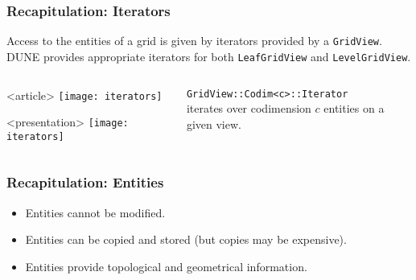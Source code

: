 \begin{frame}
  \frametitle{Recapitulation: Iterators}
  Access to the entities of a grid is given by iterators provided by a \lstinline!GridView!. DUNE provides
  appropriate iterators for both \lstinline!LeafGridView! and \lstinline!LevelGridView!.
  \begin{columns}
    \begin{column}{0.47\linewidth}
      \begin{center}
        \begin{onlyenv}<article>
          \texttt{[image: iterators]}
        \end{onlyenv}
      \end{center}
      \begin{onlyenv}<presentation>
        \texttt{[image: iterators]}
      \end{onlyenv}
    \end{column}
    \begin{column}{0.53\linewidth}
      \lstinline!GridView::Codim<c>::Iterator!\\ iterates over codimension
        $c$ entities on a given view.
    \end{column}
  \end{columns}
\end{frame}

\begin{frame} \frametitle{Recapitulation: Entities}



  \begin{itemize}
  \item Entities cannot be modified.
  \item Entities can be copied and stored (but copies may be expensive).
  \item Entities provide topological and geometrical information.
  \end{itemize}
\end{frame}

